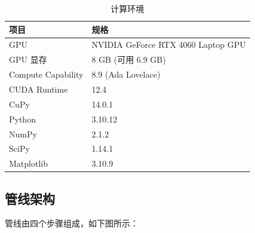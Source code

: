 \documentclass[11pt,a4paper]{article}
\begin{document}
\begin{table}[H]
  \centering
  \caption{计算环境}
  \label{tab:environment}
  \begin{tabular}{ll}
    \toprule
    项目 & 规格 \\
    \midrule
    GPU & NVIDIA GeForce RTX 4060 Laptop GPU \\
    GPU 显存 & 8 GB (可用 6.9 GB) \\
    Compute Capability & 8.9 (Ada Lovelace) \\
    CUDA Runtime & 12.4 \\
    CuPy & 14.0.1 \\
    Python & 3.10.12 \\
    NumPy & 2.1.2 \\
    SciPy & 1.14.1 \\
    Matplotlib & 3.10.9 \\
    \bottomrule
  \end{tabular}
\end{table}

\subsection{管线架构}

管线由四个步骤组成，如下图所示：
\end{document}
